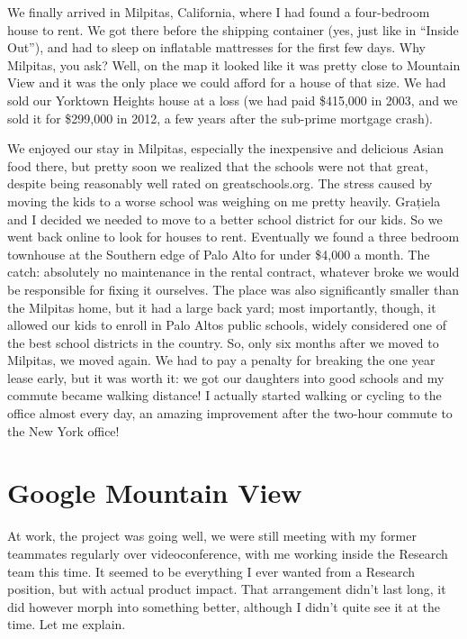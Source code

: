 \documentclass[12pt]{book}
\begin{document}
We finally arrived in Milpitas, California, where I had found a
four-bedroom house to rent. We got there before the shipping container
(yes, just like in ``Inside Out''), and had to sleep on inflatable
mattresses for the first few days. Why Milpitas, you ask? Well, on the
map it looked like it was pretty close to Mountain View and it was the
only place we could afford for a house of that size. We had sold our
Yorktown Heights house at a loss (we had paid \$415,000 in 2003, and we
sold it for \$299,000 in 2012, a few years after the sub-prime mortgage
crash).

We enjoyed our stay in Milpitas, especially the inexpensive and
delicious Asian food there, but pretty soon we realized that the schools
were not that great, despite being reasonably well rated on
greatschools.org. The stress caused by moving the kids to a worse school
was weighing on me pretty heavily. Grațiela and I decided we needed to
move to a better school district for our kids. So we went back online to
look for houses to rent. Eventually we found a three bedroom townhouse
at the Southern edge of Palo Alto for under \$4,000 a month. The catch:
absolutely no maintenance in the rental contract, whatever broke we
would be responsible for fixing it ourselves. The place was also
significantly smaller than the Milpitas home, but it had a large back
yard; most importantly, though, it allowed our kids to enroll in Palo
Altos public schools, widely considered one of the best school districts
in the country. So, only six months after we moved to Milpitas, we moved
again. We had to pay a penalty for breaking the one year lease early,
but it was worth it: we got our daughters into good schools and my
commute became walking distance! I actually started walking or cycling
to the office almost every day, an amazing improvement after the
two-hour commute to the New York office!


\section{Google Mountain View}

At work, the project was going well, we were still meeting with my
former teammates regularly over videoconference, with me working inside
the Research team this time. It seemed to be everything I ever wanted
from a Research position, but with actual product impact. That
arrangement didn't last long, it did however morph into something
better, although I didn't quite see it at the time. Let me explain.
\end{document}
